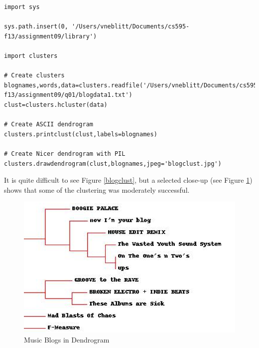 \documentclass{article}
\begin{document}
\begin{lstlisting}[frame=single, caption=generateImages.py, label=generateImages]
import sys

sys.path.insert(0, '/Users/vneblitt/Documents/cs595-f13/assignment09/library')

import clusters

# Create clusters
blognames,words,data=clusters.readfile('/Users/vneblitt/Documents/cs595-f13/assignment09/q01/blogdata1.txt')
clust=clusters.hcluster(data)

# Create ASCII dendrogram
clusters.printclust(clust,labels=blognames)

# Create Nicer dendrogram with PIL
clusters.drawdendrogram(clust,blognames,jpeg='blogclust.jpg')
\end{lstlisting}

It is quite difficult to see Figure \ref{blogclust}, but a selected close-up (see Figure \ref{musicblogs}) shows that some of the clustering was moderately successful. 

\begin{figure}[H]
\centering
\includegraphics[scale=0.50]{q02/musicblogs}
\caption{Music Blogs in Dendrogram}
\label{musicblogs}
\end{figure}
\end{document}
